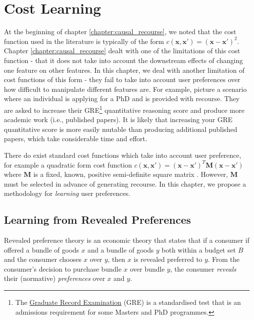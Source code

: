 \chapter{Cost Learning}

At the beginning of chapter \ref{chapter:causal_recourse}, we noted that the cost function used in the literature is typically of the form $c(\mathbf{x}, \mathbf{x}') = (\mathbf{x} - \mathbf{x}')^2$. Chapter \ref{chapter:causal_recourse} dealt with one of the limitations of this cost function - that it does not take into account the downstream effects of changing one feature on other features. In this chapter, we deal with another limitation of cost functions of this form - they fail to take into account user preferences over how difficult to manipulate different features are. For example, picture a scenario where an individual is applying for a PhD and is provided with recourse. They are asked to increase their GRE\footnote{The \href{https://www.ets.org/gre.html}{Graduate Record Examination} (GRE) is a standardised test that is an admissions requirement for some Masters and PhD programmes.} quantitative reasoning score and produce more academic work (i.e., published papers). It is likely that increasing your GRE quantitative score is more easily mutable than producing additional published papers, which take considerable time and effort.

There do exist standard cost functions which take into account user preference, for example a quadratic form cost function $c(\mathbf{x}, \mathbf{x}') = (\mathbf{x-x'})^T\mathbf{M}(\mathbf{x-x'})$ where $\mathbf{M}$ is a fixed, known, positive semi-definite square matrix \citep{bechavodInformationDiscrepancyStrategic2022}. However, $\mathbf{M}$ must be selected in advance of generating recourse. In this chapter, we propose a methodology for \textit{learning} user preferences.


\section{Learning from Revealed Preferences}

Revealed preference theory \citep{samuelsonNotePureTheory1938, samuelsonConsumptionTheoryTerms1948} is an economic theory that states that if a consumer if offered a bundle of goods $x$ and a bundle of goods $y$ both within a budget set $B$ and the consumer chooses $x$ over $y$, then $x$ is revealed preferred to $y$. From the consumer's decision to purchase bundle $x$ over bundle $y$, the consumer \textit{reveals} their (normative) \textit{preferences} over $x$ and $y$.

